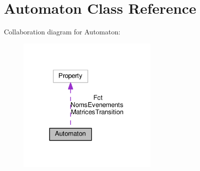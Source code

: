 \hypertarget{class_automaton}{}\section{Automaton Class Reference}
\label{class_automaton}


Collaboration diagram for Automaton\+:\nopagebreak
\begin{figure}[H]
\begin{center}
\leavevmode
\includegraphics[width=194pt]{class_automaton__coll__graph}
\end{center}
\end{figure}
